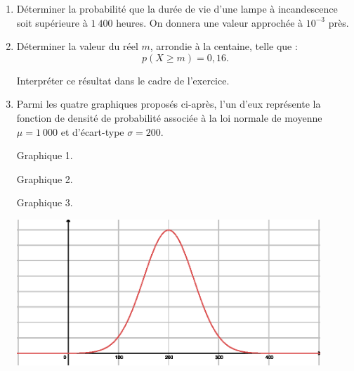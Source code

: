 \begin{enumerate}
     \item
     Déterminer la probabilité que la durée de vie d'une lampe à incandescence soit supérieure à $1\ 400$ heures. On donnera une valeur approchée à $10^{-3}$ près.
     \item
     Déterminer la valeur du réel $m$, arrondie à la centaine, telle que :
     \[ p(X \geqslant m) = 0,16. \]
     \par
     Interpréter ce résultat dans le cadre de l'exercice.
     \item
     Parmi les quatre graphiques proposés ci-après, l'un d'eux représente la fonction de densité de probabilité associée à la loi normale de moyenne $\mu =1\ 000$ et d'écart-type $\sigma = 200$.
     \par

\begin{center}
\end{center}
     \begin{center}
          Graphique 1.
     \end{center}
     \par

\begin{center}
\end{center}
     \begin{center}
          Graphique 2.
     \end{center}
\par
\begin{center}
\end{center}
     \begin{center}
          Graphique 3.
     \end{center}
     \par
     \begin{center}
          \begin{extern}%
               \includegraphics[width=0.9\textwidth]{images/BBESL-s5-1-4}%
          \end{extern}
     \end{center}


\end{enumerate}
